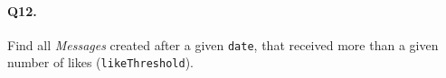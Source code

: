 \paragraph{Q12.}
Find all \emph{Messages} created after a given \texttt{date}, that
received more than a given number of likes (\texttt{likeThreshold}).
